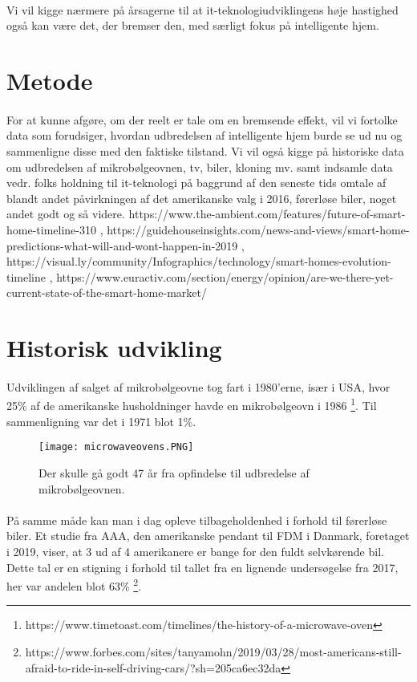 \documentclass{article}
\begin{document}
\paragraph{}
Vi vil kigge nærmere på årsagerne til at it-teknologiudviklingens høje hastighed også kan være det, der bremser den, med særligt fokus på intelligente hjem.
\section{Metode}
\paragraph{}
For at kunne afgøre, om der reelt er tale om en bremsende effekt, vil vi fortolke 
data som forudsiger, hvordan udbredelsen af intelligente hjem burde se ud nu og 
sammenligne disse med den faktiske tilstand.
Vi vil også kigge på historiske data om udbredelsen af mikrobølgeovnen, tv, biler, kloning mv. samt indsamle data vedr. folks holdning til it-teknologi på baggrund af den seneste tids omtale af blandt andet påvirkningen af det amerikanske valg i 2016, førerløse biler, noget andet godt og så videre.
https://www.the-ambient.com/features/future-of-smart-home-timeline-310 , https://guidehouseinsights.com/news-and-views/smart-home-predictions-what-will-and-wont-happen-in-2019 , https://visual.ly/community/Infographics/technology/smart-homes-evolution-timeline , https://www.euractiv.com/section/energy/opinion/are-we-there-yet-current-state-of-the-smart-home-market/
\section{Historisk udvikling}
\paragraph{}
Udviklingen af salget af mikrobølgeovne tog fart i 1980'erne, især i USA, hvor 25\% af de amerikanske husholdninger havde en mikrobølgeovn i 1986 \footnote{https://www.timetoast.com/timelines/the-history-of-a-microwave-oven}.
Til sammenligning var det i 1971 blot 1\%.
\begin{figure}[htb]
    \centering
    \texttt{[image: microwaveovens.PNG]}
    \caption{Der skulle gå godt 47 år fra opfindelse til udbredelse af mikrobølgeovnen.}
    \label{fig:microwaveovens}
\end{figure}
\paragraph{}
På samme måde kan man i dag opleve tilbageholdenhed i forhold til førerløse biler. Et studie fra AAA, den amerikanske pendant
til FDM i Danmark, foretaget i 2019, viser, at 3 ud af 4 amerikanere er bange for den fuldt selvkørende bil.
Dette tal er en stigning i forhold til tallet fra en lignende undersøgelse fra 2017, her var andelen blot 63\% \footnote{https://www.forbes.com/sites/tanyamohn/2019/03/28/most-americans-still-afraid-to-ride-in-self-driving-cars/?sh=205ca6ec32da}.
\end{document}
